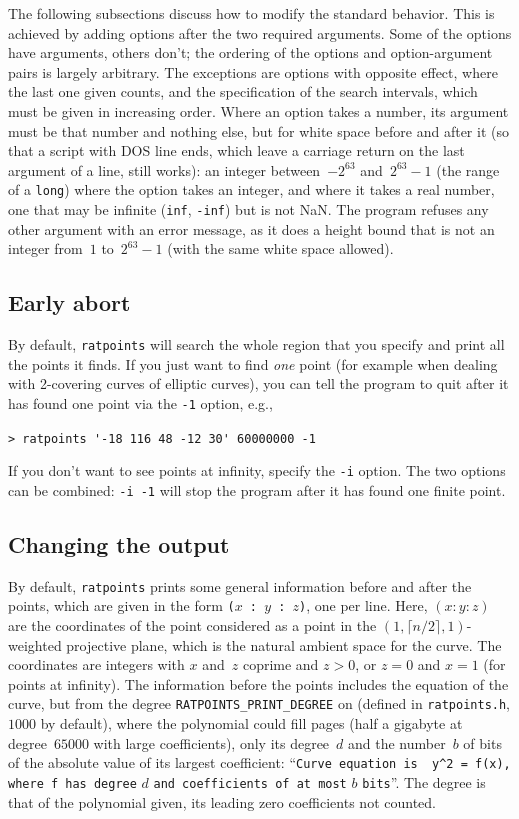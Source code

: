 \documentclass[12pt,a4paper,oneside]{amsart}
\begin{document}
The following subsections discuss how to modify the standard behavior.
This is achieved by adding options after the two required arguments.
Some of the options have arguments, others don't; the ordering of
the options and option-argument pairs is largely arbitrary.
The exceptions are options with opposite effect, where the last one given counts,
and the specification of the search intervals, which must be given in increasing order.
Where an option takes a number, its argument must be that number and nothing
else, but for white space before and after it (so that a script with DOS
line ends, which leave a carriage return on the last argument of a line,
still works): an integer between~$-2^{63}$ and~$2^{63}-1$ (the range of a
\texttt{long}) where the option takes an integer, and where it takes a real
number, one that may be infinite (\verb+inf+, \verb+-inf+) but is not NaN. The
program refuses any other argument with an error message, as it does a height
bound that is not an integer from~$1$ to~$2^{63}-1$ (with the same white
space allowed).

\subsection{Early abort}

By default, \texttt{ratpoints} will search the whole region that you specify
and print all the points it finds. If you just want to find {\em one}
point (for example when dealing with 2-covering curves of elliptic curves),
you can tell the program to quit after it has found one point via the
\verb+-1+ option, e.g.,

\verb+> ratpoints '-18 116 48 -12 30' 60000000 -1+

If you don't want to see points at infinity, specify the \verb+-i+ option.
The two options can be combined: \verb+-i -1+ will stop the program after
it has found one finite point.

\subsection{Changing the output}

By default, \texttt{ratpoints} prints some general information before and
after the points, which are given in the form
\verb+(+$x$\verb+ : +$y$\verb+ : +$z$\verb+)+, one per line.
Here, $(x : y : z)$ are the coordinates of the point considered as a point
in the $(1, \lceil n/2\rceil, 1)$-weighted projective plane, which is the
natural ambient space for the curve. The coordinates are integers with
$x$ and~$z$ coprime and $z > 0$, or $z = 0$ and $x = 1$ (for points at
infinity). The information before the points includes the equation of the
curve, but from the degree \texttt{RATPOINTS\_PRINT\_DEGREE} on (defined in
\texttt{ratpoints.h}, $1000$ by default), where the polynomial could fill
pages (half a gigabyte at degree~$65000$ with large coefficients), only its
degree~$d$ and the number~$b$ of bits of the absolute value of its largest
coefficient: ``\texttt{Curve equation is\ \ y\^{}2 = f(x), where f has
degree} $d$ \texttt{and coefficients of at most} $b$ \texttt{bits}''. The
degree is that of the polynomial given, its leading zero coefficients not
counted.
\end{document}
